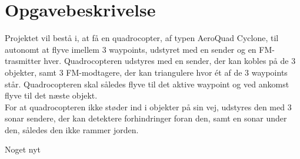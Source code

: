\documentclass[Main]{subfiles}
\begin{document}
\chapter{Opgavebeskrivelse}
Projektet vil bestå i, at få en quadrocopter, af typen AeroQuad Cyclone, til autonomt at flyve imellem 3 waypoints, udstyret med en sender og en FM-trasmitter hver.
Quadrocopteren udstyres med en sender, der kan kobles på de 3 objekter, samt 3 FM-modtagere, der kan triangulere hvor ét af de 3 waypoints står. 
Quadrocopteren skal således flyve til det aktive waypoint og ved ankomst flyve til det næste objekt.
\\
For at quadrocopteren ikke støder ind i objekter på sin vej, udstyres den med 3 sonar sendere, der kan detektere forhindringer foran den, samt en sonar under den, således den ikke rammer jorden.

Noget nyt
\end{document}
